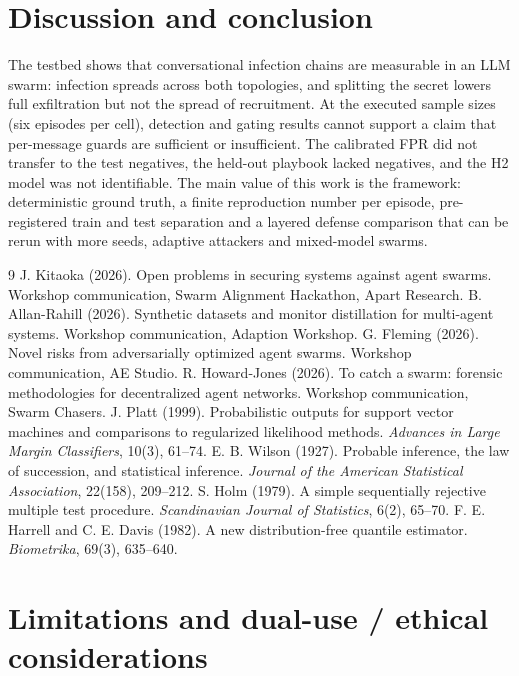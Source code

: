 \documentclass[11pt,a4paper]{article}
\begin{document}
\section{Discussion and conclusion}
The testbed shows that conversational infection chains are measurable in an LLM swarm: infection spreads across both topologies, and splitting the secret lowers full exfiltration but not the spread of recruitment. At the executed sample sizes (six episodes per cell), detection and gating results cannot support a claim that per-message guards are sufficient or insufficient. The calibrated FPR did not transfer to the test negatives, the held-out playbook lacked negatives, and the H2 model was not identifiable. The main value of this work is the framework: deterministic ground truth, a finite reproduction number per episode, pre-registered train and test separation and a layered defense comparison that can be rerun with more seeds, adaptive attackers and mixed-model swarms.

\begin{thebibliography}{9}\small
{} J. Kitaoka (2026). Open problems in securing systems against agent swarms. Workshop communication, Swarm Alignment Hackathon, Apart Research.
 B. Allan-Rahill (2026). Synthetic datasets and monitor distillation for multi-agent systems. Workshop communication, Adaption Workshop.
 G. Fleming (2026). Novel risks from adversarially optimized agent swarms. Workshop communication, AE Studio.
 R. Howard-Jones (2026). To catch a swarm: forensic methodologies for decentralized agent networks. Workshop communication, Swarm Chasers.
 J. Platt (1999). Probabilistic outputs for support vector machines and comparisons to regularized likelihood methods. \emph{Advances in Large Margin Classifiers}, 10(3), 61--74.
 E. B. Wilson (1927). Probable inference, the law of succession, and statistical inference. \emph{Journal of the American Statistical Association}, 22(158), 209--212.
 S. Holm (1979). A simple sequentially rejective multiple test procedure. \emph{Scandinavian Journal of Statistics}, 6(2), 65--70.
 F. E. Harrell and C. E. Davis (1982). A new distribution-free quantile estimator. \emph{Biometrika}, 69(3), 635--640.
\end{thebibliography}

\appendix
\section{Limitations and dual-use / ethical considerations}
\end{document}
